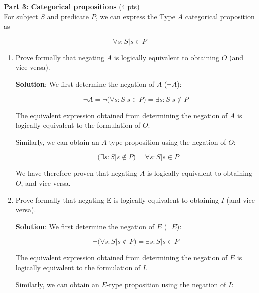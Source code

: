 \documentclass[12pt]{article}
\begin{document}
\begin{spacing}{1.5}
\begin{enumerate}
	\end{enumerate}
						
	\noindent \textbf{Part 3: Categorical propositions} (4 pts)\\
	For subject $S$ and predicate $P$, we can express the Type $A$ categorical proposition as
						
	$$\forall s : S | s \in P$$
						
	\begin{enumerate}
		\item Prove formally that negating $A$ is logically equivalent to obtaining $O$ (and vice versa).
		      		      		      		      		      		      
		      \textbf{Solution}: We first determine the negation of $A$ ($\neg A$):
		      		      		      		      		      		      
		      $$\neg A = \neg (\forall s : S | s \in P ) = \exists s : S | s \notin P$$
		      		      		      		      		      		      
		      The equivalent expression obtained from determining the negation of $A$ is logically equivalent to the formulation of $O$.
		      		      		      		      		      		      
		      Similarly, we can obtain an $A$-type proposition using the negation of $O$:
		      		      		      		      		      		      
		      $$\neg (\exists s : S | s \notin P) = \forall s : S | s \in P$$
		      		      		      		      		      		      
		      We have therefore proven that negating $A$ is logically equivalent to obtaining $O$, and vice-versa.
		      		      		      		      		      		              
		\item Prove formally that negating E is logically equivalent to obtaining $I$ (and vice versa).
		      		      		      		      		      		      
		      \textbf{Solution}: We first determine the negation of $E$ ($\neg E$):
		      		      		      		      		      		      
		      $$\neg (\forall s : S | s \notin P)=\exists s : S | s \in P$$
		      		      		      		      		      		      
		      The equivalent expression obtained from determining the negation of $E$ is logically equivalent to the formulation of $I$.
		      		      		      		      		      		      
		      Similarly, we can obtain an $E$-type proposition using the negation of $I$:
		      		      		      		      		      		      

\end{enumerate}
\end{spacing}
\end{document}
